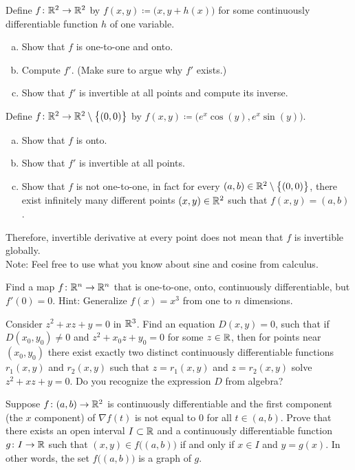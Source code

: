 \begin{exercise}
Define $f \colon {\mathbb{R}}^2 \to {\mathbb{R}}^2$ by $f(x,y) \coloneqq
\bigl(x,y+h(x)\bigr)$ for some continuously differentiable function $h$ of one
variable.
\begin{enumerate}[a)]
\item
Show that $f$ is one-to-one and onto.
\item
Compute $f'$.  (Make sure to argue why $f'$ exists.)
\item
Show that $f'$ is invertible at all points and compute
its inverse.
\end{enumerate}
\end{exercise}

\begin{exercise}
Define $f \colon {\mathbb{R}}^2 \to {\mathbb{R}}^2 \setminus \bigl\{ (0,0) \bigr\}$ by
$f(x,y) \coloneqq \bigl(e^x\cos(y),e^x\sin(y)\bigr)$.
\begin{enumerate}[a)]
\item
Show that $f$ is onto.
\item
Show that $f'$ is invertible at all points.
\item
Show that $f$ is not one-to-one, in fact for every $(a,b) \in {\mathbb{R}}^2
\setminus \bigl\{ (0,0) \bigr\}$,
there exist infinitely many different points $(x,y) \in {\mathbb{R}}^2$ such that 
$f(x,y) = (a,b)$.
\end{enumerate}
Therefore, invertible derivative at every point does not mean that
$f$ is invertible globally.\\
Note: Feel free to use what you know about sine and cosine from calculus.
\end{exercise}

\begin{exercise}
Find a map $f \colon {\mathbb{R}}^n \to {\mathbb{R}}^n$ that is one-to-one, onto,
continuously differentiable, but $f'(0) = 0$.  Hint: Generalize $f(x) = x^3$ from one
to $n$ dimensions.
\end{exercise}

\begin{exercise}
Consider $z^2 + xz + y =0$ in ${\mathbb{R}}^3$.  Find an equation $D(x,y)=0$, such that
if $D(x_0,y_0) \neq 0$ and $z^2+x_0z+y_0 = 0$ for some $z \in {\mathbb{R}}$,
then for points near $(x_0,y_0)$ there exist
exactly two distinct continuously differentiable functions $r_1(x,y)$
and $r_2(x,y)$ such that $z=r_1(x,y)$ and $z=r_2(x,y)$ solve
$z^2 + xz + y =0$.  Do you recognize the expression $D$ from algebra?
\end{exercise}


\begin{exercise}
Suppose $f \colon (a,b) \to {\mathbb{R}}^2$ is continuously differentiable and
the first component (the $x$ component) of $\nabla f(t)$ is not equal to 0
for all $t \in (a,b)$.
Prove that there exists an open interval $I \subset {\mathbb{R}}$ and
a continuously differentiable function $g \colon I \to {\mathbb{R}}$
such that 
$(x,y) \in f\bigl((a,b)\bigr)$ if and only if $x \in I$ and $y=g(x)$.
In other words, the set
$f\bigl((a,b)\bigr)$ is a graph of $g$.
\end{exercise}

